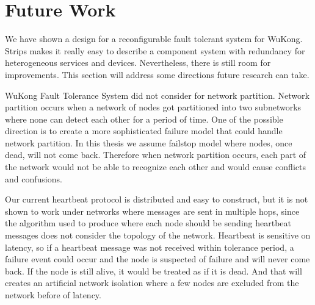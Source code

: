 \section{Future Work}



We have shown a design for a reconfigurable fault tolerant system for WuKong.
Strips makes it really easy to describe a component system with redundancy for
heterogeneous services and devices. Nevertheless, there is still room for
improvements. This section will address some directions future research can take.

WuKong Fault Tolerance System did not consider for network partition. Network
partition occurs when a network of nodes got partitioned into two subnetworks where
none can detect each other for a period of time. One of the possible direction
is to create a more sophisticated failure model that could handle network partition.
In this thesis we assume failstop model where nodes, once dead, will not come
back. Therefore when network partition occurs, each part of the network would
not be able to recognize each other and would cause conflicts and confusions.

Our current heartbeat protocol is distributed and easy to construct, but it is
not shown to work under networks where messages are sent in multiple hops, since
the algorithm used to produce where each node should be sending heartbeat
messages does not consider the topology of the network. Heartbeat is sensitive
on latency, so if a heartbeat message was not received within tolerance period,
a failure event could occur and the node is suspected of failure and will
never come back. If the node is still alive, it would be treated as if it is
dead. And that will creates an artificial network isolation where a few nodes
are excluded from the network before of latency.

